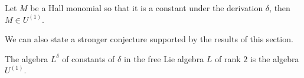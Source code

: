 \documentclass{cimart}
\begin{document}
\begin{conjecture}
Let $M$ be a Hall monomial so that it is a constant under the derivation $\delta$, then $M\in U^{(1)}$. 
\end{conjecture}

We can also state a stronger conjecture supported by the results of this section.

\begin{conjecture}
The algebra $L^\delta$ of constants of $\delta$ in the free Lie algebra $L$ of rank $2$ is the algebra $U^{(1)}$.
\end{conjecture}



\end{document}
